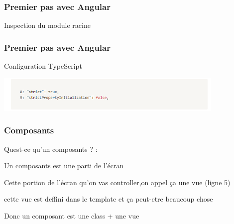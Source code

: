 \documentclass[10pt]{beamer}
\begin{document}
	\begin{frame}
		\frametitle{Premier pas avec Angular}

		\centering
		Inspection du module racine \newline \newline

	\end{frame}

	\begin{frame}
		\frametitle{Premier pas avec Angular}

		\centering
		Configuration TypeScript \newline \newline


		\centering
		\includegraphics[width=11cm]{assets/tsConfig} \newline

	\end{frame}


	\begin{frame}
		\frametitle{Composants}

		Quest-ce qu'un composants ? : \newline \newline

		Un composants est une parti de l'écran \newline \newline

		Cette portion de l’écran qu’on vas controller,\newline on appel ça une vue  (ligne 5) \newline \newline

		cette vue est deffini dans le template et ça peut-etre beaucoup chose \newline \newline

		Donc un composant est une class + une vue
	\end{frame}
\end{document}
